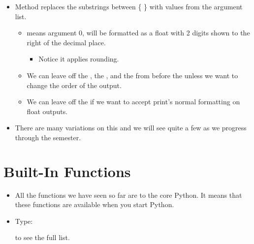 \documentclass[letterpaper,10pt,english]{sphinxmanual}
\begin{document}
\begin{itemize}
\item {} 
Method  replaces the substrings between \{ \} with
values from the argument list.
\begin{itemize}
\item {} 
 means argument 0, will be formatted as a float with 2
digits shown to the right of the decimal place.
\begin{itemize}
\item {} 
Notice it applies rounding.

\end{itemize}

\item {} 
We can leave off the , the , and the  from before the \sphinxstyleemphasis{:} unless
we want to change the order of the output.

\item {} 
We can leave off the  if we want to accept print’s normal
formatting on float outputs.

\end{itemize}

\item {} 
There are many variations on this and we will see quite a few as we
progress through the semester.

\end{itemize}


\section{Built-In Functions}
\label{\detokenize{lecture_notes/lec04_modules_functions1:built-in-functions}}\begin{itemize}
\item {} 
All the functions we have seen so far are  to the core
Python. It means that these functions are available when you start
Python.

\item {} 
Type:

\begin{sphinxVerbatim}[commandchars=\\\{\}]
\end{sphinxVerbatim}

to see the full list.

\end{itemize}
\end{document}
